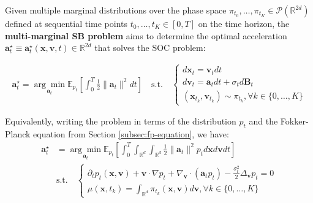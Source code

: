 \documentclass{article}
\begin{document}
\begin{definition}
    Given multiple marginal distributions over the phase space $\pi_{t_0}, \dots , \pi_{t_K}\in \mathcal{P}(\mathbb{R}^{2d})$ defined at sequential time points $t_0, \dots, t_K\in [0,T]$ on the time horizon, the \textbf{multi-marginal SB problem} aims to determine the optimal acceleration $\boldsymbol{a}_t^\star\equiv\boldsymbol{a}^\star_t(\boldsymbol{x}, \boldsymbol{v},t)\in \mathbb{R}^{2d}$ that solves the SOC problem: 
    \begin{small}
    \begin{align}
        \boldsymbol{a}^\star_t=\underset{\boldsymbol{a}_t}{\arg\min}\mathbb{E}_{p_t}\left[\int_0^T\frac{1}{2}\|\boldsymbol{a}_t\|^2 dt\right]\quad \text{s.t.}\quad \begin{cases}
            d\boldsymbol{x}_t=\boldsymbol{v}_tdt\\
            d\boldsymbol{v}_t=\boldsymbol{a}_tdt+ \sigma_td\boldsymbol{B}_t\\
            (\boldsymbol{x}_{t_k}, \boldsymbol{v}_{t_k})\sim \pi_{t_k}, \forall k\in \{0, \dots, K\}
        \end{cases}
    \end{align}
    \end{small}
    Equivalently, writing the problem in terms of the distribution $p_t$ and the Fokker-Planck equation from Section \ref{subsec:fp-equation}, we have:
    \begin{align}
    \boldsymbol{a}^\star_t&=\underset{\boldsymbol{a}_t}{\arg\min}\mathbb{E}_{p_t}\left[\int_0^T\int_{\mathbb{R}^d}\int_{\mathbb{R}^d}\frac{1}{2}\|\boldsymbol{a}_t\|^2p_td\boldsymbol{x}d\boldsymbol{v}dt\right]\\ &\text{s.t.}\quad \begin{cases}
            \partial_tp_t(\boldsymbol{x},\boldsymbol{v})+\boldsymbol{v}\cdot \nabla p_t+\nabla_{\boldsymbol{v}}\cdot (\boldsymbol{a}_tp_t)-\frac{\sigma_t^2}{2}\Delta_{\boldsymbol{v}}p_t=0\\
            \mu(\boldsymbol{x}, t_k)=\int_{\mathbb{R}^d}\pi_{t_k}(\boldsymbol{x}, \boldsymbol{v})d\boldsymbol{v}, \forall k\in \{0, \dots, K\}
        \end{cases}\label{eq:mmsb-fpe}
    \end{align}
\end{definition}
\end{document}
